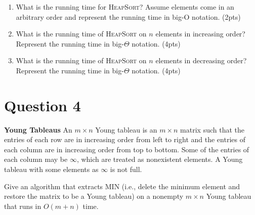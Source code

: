 \documentclass[11pt]{article}
\begin{document}
\begin{enumerate}
\item What is the running time for \textsc{HeapSort}? Assume elements come in an arbitrary order and represent the running time in big-O notation. (2pts)
\item What is the running time of \textsc{HeapSort} on $n$ elements in increasing order? Represent the running time in big-$\Theta$ notation. (4pts)
\item What is the running time of \textsc{HeapSort} on $n$ elements in decreasing order?  Represent the running time in big-$\Theta$ notation. (4pts)
\end{enumerate}

\section{Question 4} \textbf{Young Tableaus} An $m \times n$ Young tableau is an $m\times n$ matrix such that the entries of each row are in increasing order from left to right and the entries of each column are in increasing order from top to bottom. Some of the entries of each column may be $\infty$, which are treated as nonexistent elements. A Young tableau with some elements as $\infty$ is not full. 

Give an algorithm that extracts MIN (i.e., delete the minimum element and restore the matrix to be a Young tableau) on a nonempty $m\times n$ Young tableau that runs in $O(m+n)$ time. 
\end{document}
